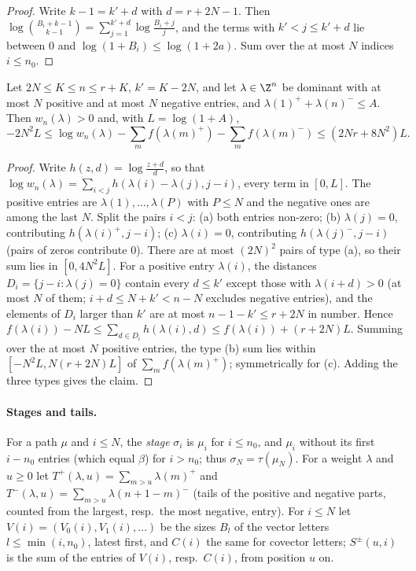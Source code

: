 \begin{proof}
Write $k-1=k'+d$ with $d=r+2N-1$. Then $\log\binom{B_i+k-1}{k-1}=\sum_{j=1}^{k'+d}\log\frac{B_i+j}{j}$, and the terms with
$k'<j\le k'+d$ lie between $0$ and $\log(1+B_i)\le\log(1+2a)$. Sum over the at most $N$ indices $i\le n_0$.
\end{proof}

\begin{lemma}\label{pf:linkG:logweyl}
Let $2N\le K\le n\le r+K$, $k'=K-2N$, and let $\lambda\in\Z^n$ be dominant with at most $N$ positive and at most $N$ negative
entries, and $\lambda(1)^++\lambda(n)^-\le A$. Then $w_n(\lambda)>0$ and, with $L=\log(1+A)$,
\[
-2N^2L\le\log w_n(\lambda)-\sum_mf(\lambda(m)^+)-\sum_mf(\lambda(m)^-)\le(2Nr+8N^2)L .
\]
\end{lemma}

\begin{proof}
Write $h(z,d)=\log\frac{z+d}d$, so that $\log w_n(\lambda)=\sum_{i<j}h(\lambda(i)-\lambda(j),j-i)$, every term in $[0,L]$. The positive
entries are $\lambda(1),\dots,\lambda(P)$ with $P\le N$ and the negative ones are among the last $N$. Split the pairs $i<j$: (a) both
entries non-zero; (b) $\lambda(j)=0$, contributing $h(\lambda(i)^+,j-i)$; (c) $\lambda(i)=0$, contributing $h(\lambda(j)^-,j-i)$ (pairs of
zeros contribute $0$). There are at most $(2N)^2$ pairs of type (a), so their sum lies in $[0,4N^2L]$. For a positive entry
$\lambda(i)$, the distances $D_i=\{j-i:\lambda(j)=0\}$ contain every $d\le k'$ except those with $\lambda(i+d)>0$ (at most $N$ of them;
$i+d\le N+k'<n-N$ excludes negative entries), and the elements of $D_i$ larger than $k'$ are at most $n-1-k'\le r+2N$ in number.
Hence $f(\lambda(i))-NL\le\sum_{d\in D_i}h(\lambda(i),d)\le f(\lambda(i))+(r+2N)L$. Summing over the at most $N$ positive entries, the
type (b) sum lies within $[-N^2L,N(r+2N)L]$ of $\sum_mf(\lambda(m)^+)$; symmetrically for (c). Adding the three types gives the
claim.
\end{proof}

\paragraph{Stages and tails.} For a path $\mu$ and $i\le N$, the \emph{stage} $\sigma_i$ is $\mu_i$ for $i\le n_0$, and $\mu_i$ without its
first $i-n_0$ entries (which equal $\beta$) for $i>n_0$; thus $\sigma_N=\tau(\mu_N)$. For a weight $\lambda$ and $u\ge0$ let
$T^+(\lambda,u)=\sum_{m>u}\lambda(m)^+$ and $T^-(\lambda,u)=\sum_{m>u}\lambda(n+1-m)^-$ (tails of the positive and negative parts,
counted from the largest, resp.\ the most negative, entry). For $i\le N$ let $V(i)=(V_0(i),V_1(i),\dots)$ be the sizes $B_l$ of
the vector letters $l\le\min(i,n_0)$, latest first, and $C(i)$ the same for covector letters; $S^\pm(u,i)$ is the sum of the
entries of $V(i)$, resp.\ $C(i)$, from position $u$ on.

